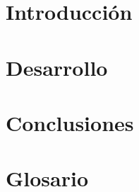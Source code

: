 \documentclass[12pt,letterpaper]{article}
\begin{document}



\tableofcontents
\newpage

\section{Introducción}

\newpage

\section{Desarrollo}

\newpage

\newpage

\newpage

\newpage

\section{Conclusiones}

\newpage

\section{Glosario}

\newpage

%


\end{document}
